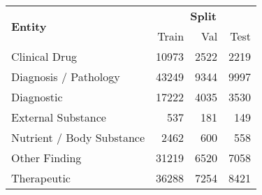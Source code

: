
\begin{tabular}{l rrr}
    \toprule
    \multirow{2}{*}[-0.5\dimexpr \aboverulesep + \belowrulesep + \cmidrulewidth]{\bfseries Entity} &
    \multicolumn{3}{c}{\bfseries Split} \\
    \cmidrule(lr){2-4}
    & Train & Val & Test \\
    \midrule
    Clinical Drug & 10973 & 2522 & 2219 \\
    Diagnosis / Pathology & 43249 & 9344 & 9997 \\
    Diagnostic & 17222 & 4035 & 3530 \\
    External Substance & 537 & 181 & 149 \\
    Nutrient / Body Substance & 2462 & 600 & 558 \\
    Other Finding & 31219 & 6520 & 7058 \\
    Therapeutic & 36288 & 7254 & 8421 \\
    \bottomrule
\end{tabular}
